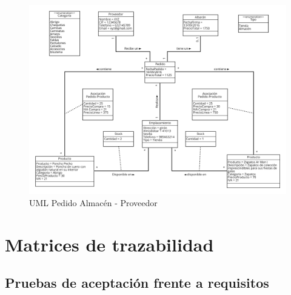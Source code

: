\begin{figure}[H]
	\includegraphics[width=\linewidth]{images/pruebas/pedido-almacen-proveedor.png}
	\caption{UML Pedido Almacén - Proveedor}
\end{figure}

\section{Matrices de trazabilidad}

\subsection{Pruebas de aceptación frente a requisitos}

